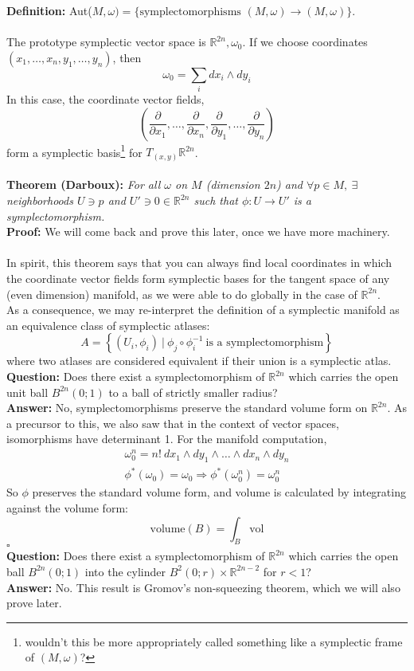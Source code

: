 \documentclass[12pt]{report}
\theoremstyle{definition}
\theoremstyle{remark}
\numberwithin{equation}{section}
\theoremstyle{definition}
\newcommand{\inv}[1]{#1^{-1}}
\newcommand{\bb}[1]{\mathbb{#1}}
\newcommand{\mqed}{\hfill\newline\null \hfill$\square$\\ }
\begin{document}
\textbf{Definition: }Aut($M,\omega) = \Big\{ \text{symplectomorphisms }(M,\omega) \to (M,\omega)\Big\}$.\\\\
The prototype symplectic vector space is $\bb R^{2n}, \omega_0$. If we choose coordinates $(x_1,\dots,x_n,y_1,\dots,y_n)$, then 
$$
	\omega_0 = \sum_i dx_i \wedge dy_i
$$
In this case, the coordinate vector fields,
$$
	\left( \frac{\partial}{\partial x_1}, \dots, \frac{\partial}{\partial x_n}, \frac{\partial}{\partial y_1}, \dots, \frac{\partial}{\partial y_n}\right)
$$
form a symplectic basis\footnote{wouldn't this be more appropriately called something like a symplectic frame of $(M,\omega)$?} for $T_{(x,y)} \bb R^{2n}$. \\\\
\textbf{Theorem (Darboux):}\textit{ For all $ \omega$ on $M$ (dimension $2n$) and $\forall p \in M,\ \exists$ neighborhoods $U \ni p$ and $U' \ni 0 \in \bb R^{2n}$ such that $\phi: U \to U'$ is a symplectomorphism.}\\
\textbf{Proof: }We will come back and prove this later, once we have more machinery. \\\\
In spirit, this theorem says that you can always find local coordinates in which the coordinate vector fields form symplectic bases for the tangent space of any (even dimension) manifold, as we were able to do globally in the case of $\bb R^{2n}$. \\
As a consequence, we may re-interpret the definition of a symplectic manifold as an equivalence class of symplectic atlases:
$$
	A = \left\{ (U_i,\phi_i)\ |\ \phi_j \circ \inv \phi_i\ \text{is a symplectomorphism}\right\}
$$
where two atlases are considered equivalent if their union is a symplectic atlas. \\
\textbf{Question: }Does there exist a symplectomorphism of $\bb R^{2n}$ which carries the open unit ball $B^{2n}(0;1)$ to a ball of strictly smaller radius? \\
\textbf{Answer: }No, symplectomorphisms preserve the standard volume form on $\bb R^{2n}$. As a precursor to this, we also saw that in the context of vector spaces, isomorphisms have determinant 1. For the manifold computation,
\begin{gather*}
		\omega_0^n = n!\ dx_1 \wedge dy_1 \wedge \dots \wedge dx_n \wedge dy_n\\
		\phi^*(\omega_0) = \omega_0 \Rightarrow \phi^*(\omega_0^n) = \omega_0^n
\end{gather*}
So $\phi$ preserves the standard volume form, and volume is calculated by integrating against the volume form: 
$$
	\text{volume}(B) = \int_{B} \text{vol}
$$
\mqed
\textbf{Question: }Does there exist a symplectomorphism of $\bb R^{2n}$ which carries the open ball $B^{2n}(0;1)$ into the cylinder $B^{2}(0;r) \times \bb R^{2n-2}$ for $r < 1$?\\
\textbf{Answer: }No. This result is Gromov's non-squeezing theorem, which we will also prove later. 
\end{document}
